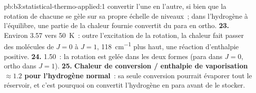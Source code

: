 \begin{solution}{pb:b3:statistical-thermo-applied:1}
convertir l'une en l'autre, si bien que la rotation de chacune se gèle
sur sa propre échelle de niveaux~; dans l'hydrogène à l'équilibre, une
partie de la chaleur fournie convertit du para en ortho.
\textbf{23.} Environ 3.57 vers \qty{50}{K}~: outre l'excitation de la
rotation, la chaleur fait passer des molécules de $J = 0$ à $J = 1$,
\qty{118}{cm^{-1}} plus haut, une réaction d'enthalpie positive.
\textbf{24.} 1.50~: la rotation est gelée dans les deux formes (para dans
$J = 0$, ortho dans $J = 1$).
\textbf{25.} \textbf{Chaleur de conversion / enthalpie de vaporisation
$\approx 1.2$ pour l'hydrogène normal}~: sa seule conversion pourrait
évaporer tout le réservoir, et c'est pourquoi on convertit l'hydrogène
en para avant de le stocker.
\end{solution}
